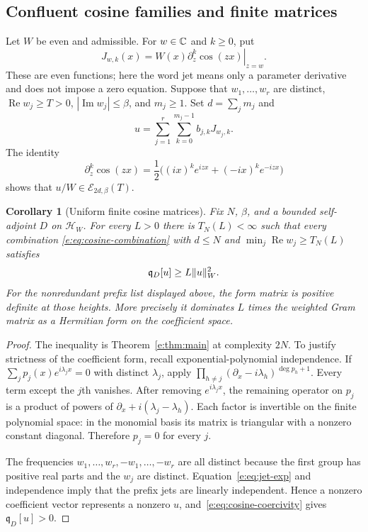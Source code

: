\documentclass[11pt,a4paper]{article}
\numberwithin{equation}{section}
\newtheorem{corollary}[theorem]{Corollary}
\theoremstyle{definition}\newtheorem{definition}[theorem]{Definition}
\theoremstyle{remark}\newtheorem{remark}[theorem]{Remark}
\newcommand{\HH}{\mathcal H_W}\newcommand{\XX}{X_W}\newcommand{\EE}{\mathcal E_{N,\beta}}
\newcommand{\qD}{\mathfrak q_D}\newcommand{\qth}{\mathfrak q_\theta}
\DeclareMathOperator{\Rea}{Re}\DeclareMathOperator{\Ima}{Im}
\begin{document}
\subsection{Confluent cosine families and finite matrices}\label{e:sec:cosine}

Let $W$ be even and admissible. For $w\in\mathbb C$ and $k\ge0$, put
\begin{equation}\label{e:eq:jets}
 J_{w,k}(x)=W(x)\left.\partial_z^k\cos(zx)\right|_{z=w}.
\end{equation}
These are even functions; here the word jet means only a parameter
derivative and does not impose a zero equation. Suppose that
$w_1,\ldots,w_r$ are distinct, $\Rea w_j\ge T>0$,
$|\Ima w_j|\le\beta$, and $m_j\ge1$. Set $d=\sum_jm_j$ and
\begin{equation}\label{e:eq:cosine-combination}
 u=\sum_{j=1}^r\sum_{k=0}^{m_j-1}b_{j,k}J_{w_j,k}.
\end{equation}
The identity
\begin{equation}\label{e:eq:jet-exp}
 \partial_z^k\cos(zx)=\frac12\bigl((ix)^ke^{izx}+(-ix)^ke^{-izx}\bigr)
\end{equation}
shows that $u/W\in\mathcal E_{2d,\beta}(T)$.

\begin{corollary}[Uniform finite cosine matrices]\label{e:cor:cosine}
Fix $N$, $\beta$, and a bounded self-adjoint $D$ on $\HH$. For every
$L>0$ there is $T_N(L)<\infty$ such that every combination
\eqref{e:eq:cosine-combination} with $d\le N$ and
$\min_j\Rea w_j\ge T_N(L)$ satisfies
\begin{equation}\label{e:eq:cosine-coercivity}
 \qD[u]\ge L\norm u_W^2.
\end{equation}
For the nonredundant prefix list displayed above, the form matrix is
positive definite at those heights. More precisely it dominates $L$ times
the weighted Gram matrix as a Hermitian form on the coefficient space.
\end{corollary}
\begin{proof}
The inequality is Theorem~\ref{e:thm:main} at complexity $2N$. To justify
strictness of the coefficient form, recall exponential-polynomial
independence. If $\sum_jp_j(x)e^{i\lambda_jx}=0$ with distinct
$\lambda_j$, apply
$\prod_{h\ne j}(\partial_x-i\lambda_h)^{\deg p_h+1}$.
Every term except the $j$th vanishes. After removing $e^{i\lambda_jx}$,
the remaining operator on $p_j$ is a product of powers of
$\partial_x+i(\lambda_j-\lambda_h)$.
Each factor is invertible on the finite polynomial space: in the monomial
basis its matrix is triangular with a nonzero constant diagonal.
Therefore $p_j=0$ for every $j$.

The frequencies $w_1,\ldots,w_r,-w_1,\ldots,-w_r$ are all distinct
because the first group has positive real parts and the $w_j$ are distinct.
Equation~\eqref{e:eq:jet-exp} and independence imply that the prefix jets
are linearly independent. Hence a nonzero coefficient vector represents a
nonzero $u$, and~\eqref{e:eq:cosine-coercivity} gives $\qD[u]>0$.
\end{proof}
\end{document}
